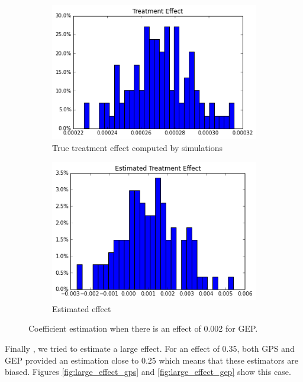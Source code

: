 \documentclass[11pt]{article}
\begin{document}
\begin{figure}[h]
\centering
\begin{subfigure}{.5\textwidth}
  \centering
  \includegraphics[width=.9\linewidth]{treatment_effect_no_influence.png}
  \caption{True treatment effect computed by simulations}
  \label{fig:sub1}
\end{subfigure}%
\begin{subfigure}{.5\textwidth}
  \centering
  \includegraphics[width=.9\linewidth]{estimated_small_effect_gep.png}
  \caption{Estimated effect}
  \label{fig:sub2}
\end{subfigure}
\caption{Coefficient estimation when there is an effect of 0.002 for GEP.}
\label{fig:small_effect_gep}
\end{figure}

\FloatBarrier

Finally , we  tried to estimate a large effect. For an effect of 0.35, both GPS and GEP provided an estimation close to 0.25 which means that these estimators are biased.   Figures \ref{fig:large_effect_gps} and \ref{fig:large_effect_gep} show this case. \\
\end{document}
